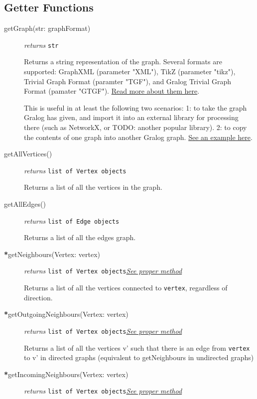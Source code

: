 \subsection{Getter Functions}
\begin{description}
\item[getGraph(str: graphFormat)]\emph{returns}
  \texttt{str}

Returns a string representation of the graph. Several formats are supported: GraphXML (parameter "XML"), TikZ (parameter "tikz"), Trivial Graph Format (paramter "TGF"), and Gralog Trivial Graph Format (pamater "GTGF"). \hyperref[graphFormatsInDetail]{Read more about them here}.

This is useful in at least the following two scenarios: 1: to take the graph Gralog has given, and import it into an external library for processing there (such as NetworkX, or TODO: another popular library). 2: to copy the contents of one graph into another Gralog graph. \hyperref[getGraphExample]{See an example here}.


\item[getAllVertices()]\emph{returns}
  \texttt{list of Vertex objects}

Returns a list of all the vertices in the graph.

\item[getAllEdges()]\emph{returns}
  \texttt{list of Edge objects}

Returns a list of all the edges graph.

\item[\textbf{*}getNeighbours(Vertex: vertex)]\emph{returns} \texttt{list of Vertex objects}\quad \hyperref[getNeighboursClass]{\textit{See proper method}}

Returns a list of all the vertices connected to \texttt{vertex}, regardless of direction.

\item[\textbf{*}getOutgoingNeighbours(Vertex: vertex)]\emph{returns} \texttt{list of Vertex objects}\quad \hyperref[getOutgoingNeighboursClass]{\textit{See proper method}}

Returns a list of all the vertices v' such that there is an edge from \texttt{vertex} to v' in directed graphs (equivalent to getNeighbours in undirected graphs)

\item[\textbf{*}getIncomingNeighbours(Vertex: vertex)]\emph{returns} \texttt{list of Vertex objects}\quad \hyperref[getIncomingNeighboursClass]{\textit{See proper method}}


\end{description}
